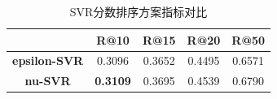 \documentclass[11pt]{article}
\begin{document}
\begin{CJK}{UTF8}{gkai}
\begin{table}[htbp]
  \centering
  \begin{tabular}{c|c|c|c|c}
    \hline
    & \textbf{R@10} & \textbf{R@15} & \textbf{R@20} & \textbf{R@50} \\
    \hline
    \textbf{epsilon-SVR} & 0.3096  & 0.3652  & 0.4495  & 0.6571  \\
    \hline
    \textbf{ nu-SVR} & \textcolor[rgb]{ 1,  0,  0}{\textbf{0.3109 }} & 0.3695  & 0.4539  & 0.6790  \\
    \hline
  \end{tabular}%
  \caption{SVR分数排序方案指标对比}
  \label{tab:addlabel}%
\end{table}%


\end{CJK}
\end{document}
